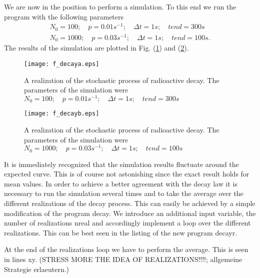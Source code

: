 We are now in the position to perform a simulation. To this end we
run the program with the following parameters
\begin{eqnarray*}
N_0 = 100; \quad p = 0.01 s^{-1}; \quad \Delta t = 1s;  \quad tend = 300s \\
N_0 = 1000; \quad p= 0.03 s^{-1}; \quad \Delta t = 1s; \quad tend = 100s.
\end{eqnarray*}
The results of the simulation are plotted in Fig. (\ref{FIG_DECAYA}) and 
(\ref{FIG_DECAYB}).
\begin{figure}
\label{FIG_DECAYA}
\texttt{[image: f\_decaya.eps]}
\caption{A realization of the stochastic process of radioactive decay.
The parameters of the simulation were $N_0 = 100; 
\quad p = 0.01 s^{-1}; \quad \Delta t = 1s;  \quad tend = 300s$}
\end{figure}
\begin{figure}
\label{FIG_DECAYB}
\texttt{[image: f\_decayb.eps]}
\caption{A realization of the stochastic process of radioactive decay.
The parameters of the simulation were $N_0 = 1000; 
\quad p = 0.03 s^{-1}; \quad \Delta t = 1s;  \quad tend = 100s$}
\end{figure}
 It is 
immediately recognized that the simulation results fluctuate around 
the expected curve. This is of course not astonishing since the 
exact result holds for mean values. In order to achieve a better
agreement with the decay law it is necessary to run the simulation
several times and to take the average over the different 
realizations of the decay process. This can easily be achieved by 
a simple modification of the program {\sf decay}. We 
introduce an additional input variable, the number of realizations
{\sf nreal} and accordingly implement a loop over the different 
realizations. This can be best seen in the listing of the 
new program {\sf decayr}.


At the end of the realizations loop
we have to perform the average. This is seen in lines xy.
(STRESS MORE THE IDEA OF REALIZATIONS!!!!; allgemeine Strategie erlaeutern.)

